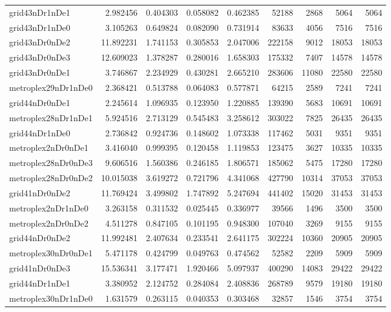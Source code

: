\begin{longtable}{|l|r|r|r|r|r|r|r|r|}
grid43nDr1nDe1 & 2.982456 & 0.404303 & 0.058082 & 0.462385 & 52188 & 2868 & 5064 & 5064 \\
grid43nDr1nDe0 & 3.105263 & 0.649824 & 0.082090 & 0.731914 & 83633 & 4056 & 7516 & 7516 \\
grid43nDr0nDe2 & 11.892231 & 1.741153 & 0.305853 & 2.047006 & 222158 & 9012 & 18053 & 18053 \\
grid43nDr0nDe3 & 12.609023 & 1.378287 & 0.280016 & 1.658303 & 175332 & 7407 & 14578 & 14578 \\
grid43nDr0nDe1 & 3.746867 & 2.234929 & 0.430281 & 2.665210 & 283606 & 11080 & 22580 & 22580 \\
metroplex29nDr1nDe0 & 2.368421 & 0.513788 & 0.064083 & 0.577871 & 64215 & 2589 & 7241 & 7241 \\
grid44nDr0nDe1 & 2.245614 & 1.096935 & 0.123950 & 1.220885 & 139390 & 5683 & 10691 & 10691 \\
metroplex28nDr1nDe1 & 5.924516 & 2.713129 & 0.545483 & 3.258612 & 303022 & 7825 & 26435 & 26435 \\
grid44nDr1nDe0 & 2.736842 & 0.924736 & 0.148602 & 1.073338 & 117462 & 5031 & 9351 & 9351 \\
metroplex2nDr0nDe1 & 3.416040 & 0.999395 & 0.120458 & 1.119853 & 123475 & 3627 & 10335 & 10335 \\
metroplex28nDr0nDe3 & 9.606516 & 1.560386 & 0.246185 & 1.806571 & 185062 & 5475 & 17280 & 17280 \\
metroplex28nDr0nDe2 & 10.015038 & 3.619272 & 0.721796 & 4.341068 & 427790 & 10314 & 37053 & 37053 \\
grid41nDr0nDe2 & 11.769424 & 3.499802 & 1.747892 & 5.247694 & 441402 & 15020 & 31453 & 31453 \\
metroplex2nDr1nDe0 & 3.263158 & 0.311532 & 0.025445 & 0.336977 & 39566 & 1496 & 3500 & 3500 \\
metroplex2nDr0nDe2 & 4.511278 & 0.847105 & 0.101195 & 0.948300 & 107040 & 3269 & 9155 & 9155 \\
grid44nDr0nDe2 & 11.992481 & 2.407634 & 0.233541 & 2.641175 & 302224 & 10360 & 20905 & 20905 \\
metroplex30nDr0nDe1 & 5.471178 & 0.424799 & 0.049763 & 0.474562 & 52582 & 2209 & 5909 & 5909 \\
grid41nDr0nDe3 & 15.536341 & 3.177471 & 1.920466 & 5.097937 & 400290 & 14083 & 29422 & 29422 \\
grid44nDr1nDe1 & 3.380952 & 2.124752 & 0.284084 & 2.408836 & 268789 & 9579 & 19180 & 19180 \\
metroplex30nDr1nDe0 & 1.631579 & 0.263115 & 0.040353 & 0.303468 & 32857 & 1546 & 3754 & 3754 \\

\end{longtable}
